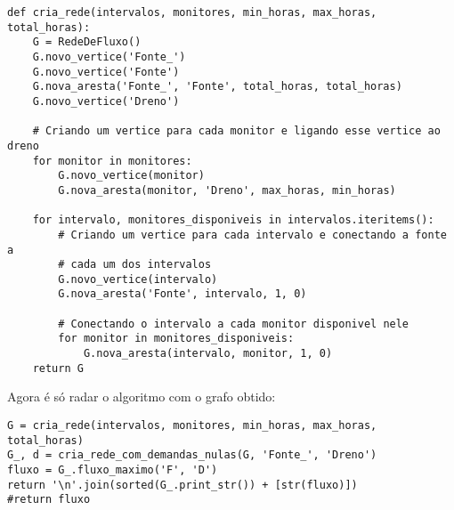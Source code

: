 \documentclass[11pt]{article}
\begin{document}
\begin{verbatim}
def cria_rede(intervalos, monitores, min_horas, max_horas, total_horas):
    G = RedeDeFluxo()
    G.novo_vertice('Fonte_')
    G.novo_vertice('Fonte')
    G.nova_aresta('Fonte_', 'Fonte', total_horas, total_horas)
    G.novo_vertice('Dreno')

    # Criando um vertice para cada monitor e ligando esse vertice ao dreno
    for monitor in monitores:
        G.novo_vertice(monitor)
        G.nova_aresta(monitor, 'Dreno', max_horas, min_horas)

    for intervalo, monitores_disponiveis in intervalos.iteritems():
        # Criando um vertice para cada intervalo e conectando a fonte a
        # cada um dos intervalos
        G.novo_vertice(intervalo)
        G.nova_aresta('Fonte', intervalo, 1, 0)

        # Conectando o intervalo a cada monitor disponivel nele
        for monitor in monitores_disponiveis:
            G.nova_aresta(intervalo, monitor, 1, 0)
    return G
\end{verbatim}

Agora é só radar o algoritmo com o grafo obtido:
\begin{verbatim}
G = cria_rede(intervalos, monitores, min_horas, max_horas, total_horas)
G_, d = cria_rede_com_demandas_nulas(G, 'Fonte_', 'Dreno')
fluxo = G_.fluxo_maximo('F', 'D')
return '\n'.join(sorted(G_.print_str()) + [str(fluxo)])
#return fluxo
\end{verbatim}
\end{document}
